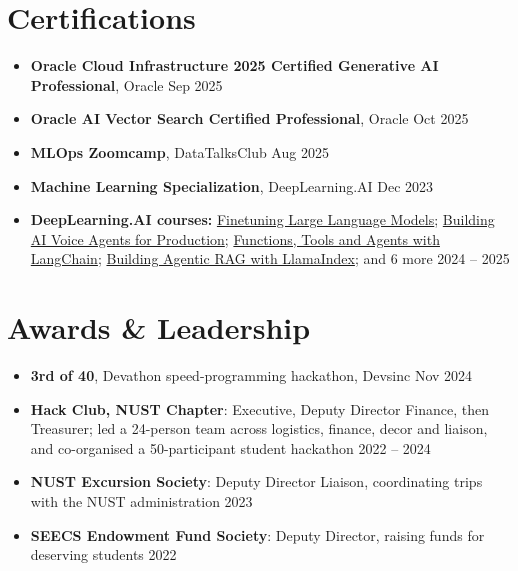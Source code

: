 \documentclass[10pt,letterpaper]{article}
\begin{document}
\section{Certifications}
\begin{itemize}
  \item \textbf{Oracle Cloud Infrastructure 2025 Certified Generative AI Professional}, Oracle \hfill Sep 2025
  \item \textbf{Oracle AI Vector Search Certified Professional}, Oracle \hfill Oct 2025
  \item \textbf{MLOps Zoomcamp}, DataTalksClub \hfill Aug 2025
  \item \textbf{Machine Learning Specialization}, DeepLearning.AI \hfill Dec 2023
  \item \textbf{DeepLearning.AI courses:} \href{https://learn.deeplearning.ai/accomplishments/ee266824-481b-4b43-83d9-594b4590c33f}{Finetuning Large Language Models}; \href{https://learn.deeplearning.ai/accomplishments/f869a5a9-3ae1-4ae8-8bf6-8e52f085ed09}{Building AI Voice Agents for Production}; \href{https://learn.deeplearning.ai/accomplishments/5422b90b-1e20-4d3b-adcb-8fe4ebbfbe5e}{Functions, Tools and Agents with LangChain}; \href{https://learn.deeplearning.ai/accomplishments/d8ae0452-edf0-46dc-a2f4-e2053670a640}{Building Agentic RAG with LlamaIndex}; and 6 more \hfill 2024 -- 2025
\end{itemize}

\section{Awards \& Leadership}
\begin{itemize}
  \item \textbf{3rd of 40}, Devathon speed-programming hackathon, Devsinc \hfill Nov 2024
  \item \textbf{Hack Club, NUST Chapter}: Executive, Deputy Director Finance, then Treasurer; led a 24-person team across logistics, finance, decor and liaison, and co-organised a 50-participant student hackathon \hfill 2022 -- 2024
  \item \textbf{NUST Excursion Society}: Deputy Director Liaison, coordinating trips with the NUST administration \hfill 2023
  \item \textbf{SEECS Endowment Fund Society}: Deputy Director, raising funds for deserving students \hfill 2022
\end{itemize}
\end{document}

